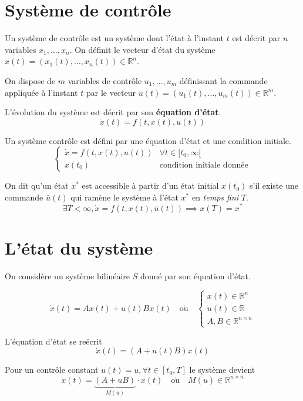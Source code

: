 \documentclass[
  french,
]{article}
\begin{document}
\hypertarget{systuxe8me-de-contruxf4le}{%
\section{Système de contrôle}\label{systuxe8me-de-contruxf4le}}

Un système de contrôle est un système dont l'état à l'instant \(t\)
est décrit par \(n\) variables \(x_1,\ldots,x_n\). On définit le vecteur d'état
du système \(x(t)=\left(x_1(t),\ldots,x_n(t)\right)\in\mathbb{R}^n\).

On dispose de \(m\) variables de contrôle \(u_1,\ldots,u_m\) définissant la commande
appliquée à l'instant \(t\) par le vecteur \(u(t)=\left(u_1(t),\ldots,u_m(t)\right)\in\mathbb{R}^m\).

L'évolution du système est décrit par son \textbf{équation d'état}.
\[\boxed{\dot{x}(t) = f(t, x(t), u(t))}\]

Un système contrôle est défini par une équation d'état et une condition initiale.
\[\begin{cases}
\dot{x} = f(t, x(t), u(t)) & \forall t\in [t_0,\infty[\\
x(t_0) &\text{condition initiale donnée}
\end{cases}\]

On dit qu'un état \(x^*\) est accessible à partir d'un état initial \(x(t_0)\)
s'il existe une commande \(\bar u(t)\) qui ramène le système à l'état
\(x^*\) en \emph{temps fini} \(T\).
\[ \exists T<\infty, \dot x = f(t,x(t),\bar u(t)) \implies x(T)=x^*\]

\hypertarget{luxe9tat-du-systuxe8me}{%
\section{L'état du système}\label{luxe9tat-du-systuxe8me}}

On considère un système bilinéaire \(S\) donné par son
équation d'état.

\[ \dot{x}(t)= Ax(t)+ u(t)Bx(t)\quad\mathrm{o\grave{u}}\quad
\begin{cases}
    x(t)\in\mathbb{R}^n\\
    u(t)\in\mathbb{R}\\
    A,B\in\mathbb{R}^{n\times n}
\end{cases}\]

L'équation d'état se reécrit
\[ \dot{x}(t)= \left(A+u(t)B\right)x(t)\]

Pour un contrôle constant \(u(t)=u,\forall t\in[t_0,T]\) le système devient
\[ \dot{x}(t)= \underbrace{\left(A + uB\right)}_{M(u)}\cdot x(t)\quad\mathrm{o\grave{u}}\quad M(u)\in\mathbb{R}^{n\times n}\]
\end{document}
